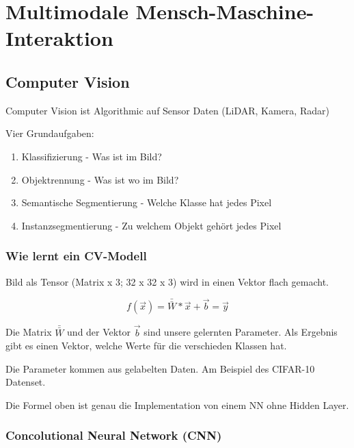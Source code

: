 \documentclass[a4paper]{article}
\title{\docTitle}
\author{Moritz}
\date{\today}
\begin{document}
\maketitle
\tableofcontents


\section{Multimodale Mensch-Maschine-Interaktion}

\subsection{Computer Vision}

Computer Vision ist Algorithmic auf Sensor Daten (LiDAR, Kamera, Radar)

Vier Grundaufgaben:

\begin{enumerate}
    \item Klassifizierung - Was ist im Bild?
    \item Objektrennung - Was ist wo im Bild?
    \item Semantische Segmentierung - Welche Klasse hat jedes Pixel
    \item Instanzsegmentierung - Zu welchem Objekt gehört jedes Pixel
\end{enumerate}

\subsubsection{Wie lernt ein CV-Modell}

Bild als Tensor (Matrix x 3; 32 x 32 x 3) wird in einen Vektor flach gemacht.

$$f(\vec{x})=\bar{\bar{W}} * \vec{x} + \vec{b} = \vec{y}$$

Die Matrix $\bar{\bar{W}}$ und der Vektor $\vec{b}$ sind unsere gelernten Parameter. Als Ergebnis gibt es einen Vektor, welche Werte für die verschieden Klassen hat. 

Die Parameter kommen aus gelabelten Daten. Am Beispiel des CIFAR-10 Datenset.

Die Formel oben ist genau die Implementation von einem NN ohne Hidden Layer.

\subsubsection{Concolutional Neural Network (CNN)}
\end{document}
